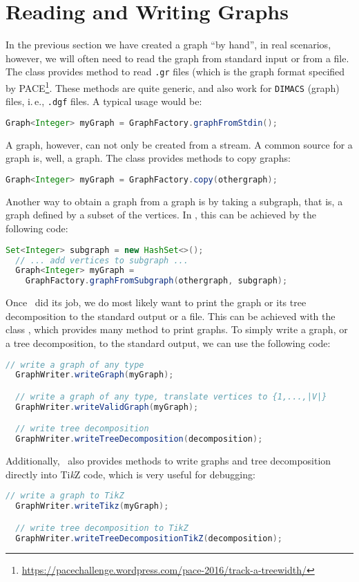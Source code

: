 \documentclass[a4paper, ukenglish, twoside, openright]{jdrasilmanual}
\begin{document}
\section{Reading and Writing Graphs}
In the previous section we have created a graph ``by hand'', in real
scenarios, however, we will often need to read the graph from
standard input or from a file. The class 
provides method to read \texttt{.gr} files (which is the graph format
specified by
PACE\footnote{\url{https://pacechallenge.wordpress.com/pace-2016/track-a-treewidth/}}. These
methods are quite generic, and also work for \texttt{DIMACS} (graph)
files, i.\,e., \texttt{.dgf} files. A typical usage would be:
\begin{lstlisting}[language=Java]
  Graph<Integer> myGraph = GraphFactory.graphFromStdin();
\end{lstlisting}
A graph, however, can not only be created from a stream. A common
source for a graph is, well, a graph. The  class
provides methods to copy graphs:
\begin{lstlisting}[language=Java]
  Graph<Integer> myGraph = GraphFactory.copy(othergraph);
\end{lstlisting}
Another way to obtain a graph from a graph is by taking a subgraph,
that is, a graph defined by a subset of the vertices. In \Jdrasil,
this can be achieved by the following code:
\begin{lstlisting}[language=Java]
  Set<Integer> subgraph = new HashSet<>();
  // ... add vertices to subgraph ...
  Graph<Integer> myGraph = 
    GraphFactory.graphFromSubgraph(othergraph, subgraph);
\end{lstlisting}

Once \Jdrasil\ did its job, we do most likely want to print the graph or
its tree decomposition to the standard output or a file. This can be
achieved with the class , which provides many
method to print graphs. To simply write a graph, or a tree
decomposition, to the standard output, we can use the following code:
\begin{lstlisting}[language=Java]
  // write a graph of any type
  GraphWriter.writeGraph(myGraph);

  // write a graph of any type, translate vertices to {1,...,|V|}
  GraphWriter.writeValidGraph(myGraph);

  // write tree decomposition
  GraphWriter.writeTreeDecomposition(decomposition);
\end{lstlisting}
Additionally, \Jdrasil\ also provides methods to write graphs and tree
decomposition directly into Ti\emph{k}Z code, which is very useful for debugging:
\begin{lstlisting}[language=Java]
  // write a graph to TikZ
  GraphWriter.writeTikz(myGraph);

  // write tree decomposition to TikZ
  GraphWriter.writeTreeDecompositionTikZ(decomposition);
\end{lstlisting}
\end{document}
